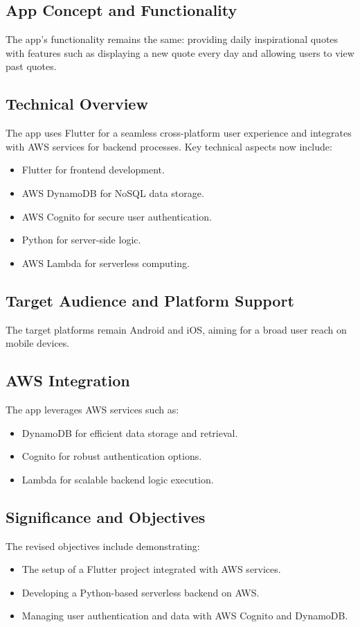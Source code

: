 \documentclass{book}
\begin{document}
\subsection{App Concept and Functionality}
The app's functionality remains the same: providing daily inspirational quotes with features such as displaying a new quote every day and allowing users to view past quotes.

\subsection{Technical Overview}
The app uses Flutter for a seamless cross-platform user experience and integrates with AWS services for backend processes. Key technical aspects now include:
\begin{itemize}
    \item Flutter for frontend development.
    \item AWS DynamoDB for NoSQL data storage.
    \item AWS Cognito for secure user authentication.
    \item Python for server-side logic.
    \item AWS Lambda for serverless computing.
\end{itemize}

\subsection{Target Audience and Platform Support}
The target platforms remain Android and iOS, aiming for a broad user reach on mobile devices.

\subsection{AWS Integration}
The app leverages AWS services such as:
\begin{itemize}
    \item DynamoDB for efficient data storage and retrieval.
    \item Cognito for robust authentication options.
    \item Lambda for scalable backend logic execution.
\end{itemize}

\subsection{Significance and Objectives}
The revised objectives include demonstrating:
\begin{itemize}
    \item The setup of a Flutter project integrated with AWS services.
    \item Developing a Python-based serverless backend on AWS.
    \item Managing user authentication and data with AWS Cognito and DynamoDB.
\end{itemize}
\end{document}
